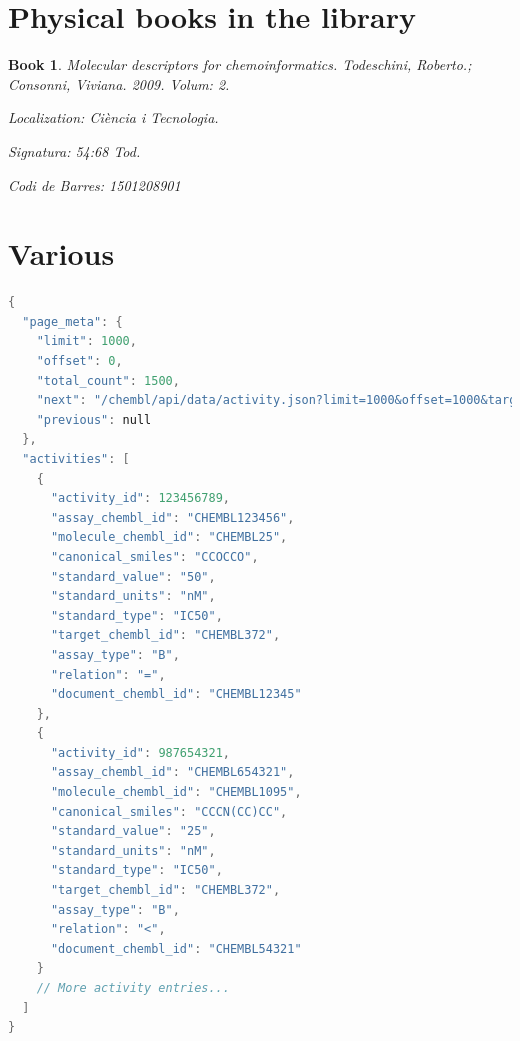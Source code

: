 \documentclass[12pt,letterpaper]{article}
\newtheorem{book}{Book}
\begin{document}

\section{Physical books in the library}
\begin{book}
Molecular descriptors for chemoinformatics. Todeschini, Roberto.; Consonni, Viviana. 2009. Volum: 2. 

Localization: Ciència i Tecnologia. 

Signatura: 54:68 Tod. 

Codi de Barres: 1501208901
\end{book}


\section{Various}

\begin{lstlisting}[language=C, caption=Example of a JSON file.]
{
  "page_meta": {
    "limit": 1000,
    "offset": 0,
    "total_count": 1500,
    "next": "/chembl/api/data/activity.json?limit=1000&offset=1000&target_chembl_id=CHEMBL372&standard_type=IC50",
    "previous": null
  },
  "activities": [
    {
      "activity_id": 123456789,
      "assay_chembl_id": "CHEMBL123456",
      "molecule_chembl_id": "CHEMBL25",
      "canonical_smiles": "CCOCCO",
      "standard_value": "50",
      "standard_units": "nM",
      "standard_type": "IC50",
      "target_chembl_id": "CHEMBL372",
      "assay_type": "B",
      "relation": "=",
      "document_chembl_id": "CHEMBL12345"
    },
    {
      "activity_id": 987654321,
      "assay_chembl_id": "CHEMBL654321",
      "molecule_chembl_id": "CHEMBL1095",
      "canonical_smiles": "CCCN(CC)CC",
      "standard_value": "25",
      "standard_units": "nM",
      "standard_type": "IC50",
      "target_chembl_id": "CHEMBL372",
      "assay_type": "B",
      "relation": "<",
      "document_chembl_id": "CHEMBL54321"
    }
    // More activity entries...
  ]
}
\end{lstlisting}

\newpage


% 
 
\end{document}
